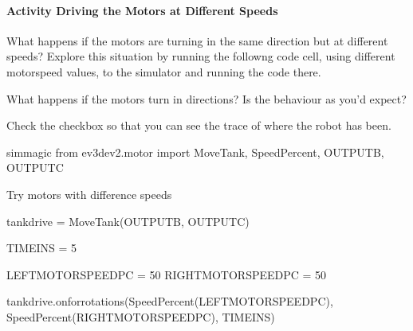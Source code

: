 \documentclass[letterpaper,10pt,english]{sphinxmanual}
\begin{document}
\paragraph{Activity \sphinxhyphen{} Driving the Motors at Different Speeds}
\label{\detokenize{content/01_Robot_Lab/Section_00_01:Activity---Driving-the-Motors-at-Different-Speeds}}
What happens if the motors are turning in the same direction but at different speeds? Explore this situation by running the followng code cell, using different motorspeed values, to the simulator and running the code there.

What happens if the motors turn in  directions? Is the behaviour as you’d expect?

Check the  checkbox so that you can see the trace of where the robot has been.



{
\begin{sphinxVerbatim}[commandchars=\\\{\}]
\llap{\color{nbsphinxin}[ ]:\,\hspace{\fboxrule}\hspace{\fboxsep}}\PYGZpc{}\PYGZpc{}sim\PYGZus{}magic
from ev3dev2.motor import MoveTank, SpeedPercent, OUTPUT\PYGZus{}B, OUTPUT\PYGZus{}C

\PYGZsh{} Try motors with difference speeds

tank\PYGZus{}drive = MoveTank(OUTPUT\PYGZus{}B, OUTPUT\PYGZus{}C)

TIME\PYGZus{}IN\PYGZus{}S = 5

LEFT\PYGZus{}MOTOR\PYGZus{}SPEED\PYGZus{}PC = \PYGZhy{}50
RIGHT\PYGZus{}MOTOR\PYGZus{}SPEED\PYGZus{}PC = \PYGZhy{}50

tank\PYGZus{}drive.on\PYGZus{}for\PYGZus{}rotations(SpeedPercent(LEFT\PYGZus{}MOTOR\PYGZus{}SPEED\PYGZus{}PC),
                          SpeedPercent(RIGHT\PYGZus{}MOTOR\PYGZus{}SPEED\PYGZus{}PC),
                          TIME\PYGZus{}IN\PYGZus{}S)
\end{sphinxVerbatim}
}
\end{document}
